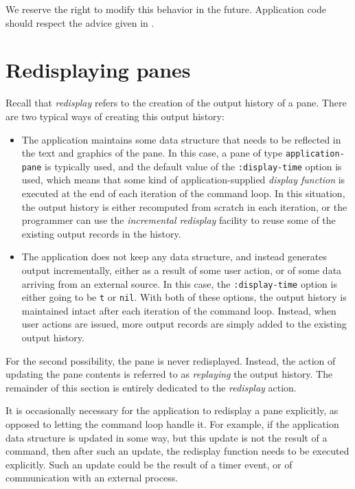We reserve the right to modify this behavior in the future.
Application code should respect the advice given in
.

\section{Redisplaying panes}

Recall that \emph{redisplay} refers to the creation of the output
history of a pane.  There are two typical ways of creating this output
history:

\begin{itemize}
\item The application maintains some data structure that needs to be
  reflected in the text and graphics of the pane.  In this case,
  a pane of type \texttt{application-pane} is typically used, and the
  default value of the \texttt{:display-time} option is used, which
  means that some kind of application-supplied \emph{display function}
  is executed at the end of each iteration of the command loop.  In
  this situation, the output history is either recomputed from scratch
  in each iteration, or the programmer can use the \emph{incremental
    redisplay} facility to reuse some of the existing output records
  in the history.
\item The application does not keep any data structure, and instead
  generates output incrementally, either as a result of some user
  action, or of some data arriving from an external source.  In this
  case, the \texttt{:display-time} option is either going to be
  \texttt{t} or \texttt{nil}.  With both of these options, the output
  history is maintained intact after each iteration of the command
  loop.  Instead, when user actions are issued, more output records
  are simply added to the existing output history.
\end{itemize}

For the second possibility, the pane is never redisplayed.  Instead,
the action of updating the pane contents is referred to as
\emph{replaying} the output history.  The remainder of this section is
entirely dedicated to the \emph{redisplay} action.

It is occasionally necessary for the application to redisplay a pane
explicitly, as opposed to letting the command loop handle it.  For
example, if the application data structure is updated in some way, but
this update is not the result of a command, then after such an update,
the redisplay function needs to be executed explicitly.  Such an
update could be the result of a timer event, or of communication with
an external process.

